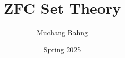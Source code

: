 \documentclass{article}
\newcounter{axiom}[section]
\newcounter{exercise}[section]
\begin{document}
\title{ZFC Set Theory}
\author{Muchang Bahng}
\date{Spring 2025}

\maketitle
\tableofcontents
\pagebreak










 
 


\end{document}
